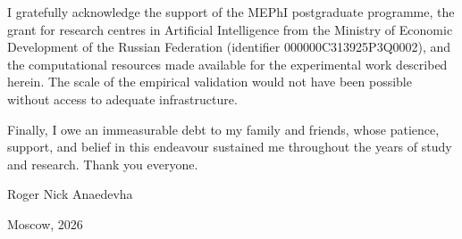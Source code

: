 I gratefully acknowledge the support of the MEPhI postgraduate programme, the grant for research centres in Artificial Intelligence from the Ministry of Economic Development of the Russian Federation (identifier 000000C313925P3Q0002), and the computational resources made available for the experimental work described herein. The scale of the empirical validation would not have been possible without access to adequate infrastructure.

Finally, I owe an immeasurable debt to my family and friends, whose patience, support, and belief in this endeavour sustained me throughout the years of study and research. Thank you everyone.

\hfill Roger Nick Anaedevha

\hfill Moscow, 2026

